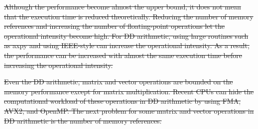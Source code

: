 \documentclass{IOS-Book-Article}
\begin{document}
{}
\sout{Although the performance become almost the upper bound, it does not mean that the execution time is reduced theoretically. Reducing the number of memory references and increasing the number of floating-point operations let the operational intensity become high. For DD arithmetic, using large routines such as axpy and using IEEE-style can increase the operational intensity. As a result, the performance can be increased with almost the same execution time before increasing the operational intensity. }



\sout{Even the DD arithmetic, matrix and vector operations are bounded on the memory performance except for matrix multiplication. Recent CPUs can hide the computational workload of these operations in DD arithmetic by using FMA, AVX2, and OpenMP. The next problem for some matrix and vector operations in DD arithmetic is the number of memory references. }
\end{document}
